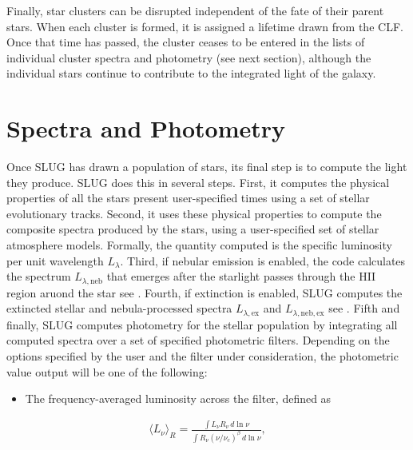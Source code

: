 \documentclass[letterpaper,10pt,english]{sphinxmanual}
\begin{document}
Finally, star clusters can be disrupted independent of the fate of their parent stars. When each cluster is formed, it is assigned a lifetime drawn from the CLF. Once that time has passed, the cluster ceases to be entered in the lists of individual cluster spectra and photometry (see next section), although the individual stars continue to contribute to the integrated light of the galaxy.


\section{Spectra and Photometry}
\label{\detokenize{intro:spectra-and-photometry}}\label{\detokenize{intro:ssec-spec-phot}}
Once SLUG has drawn a population of stars, its final step is to compute the light they produce. SLUG does this in several steps. First, it computes the physical properties of all the stars present user-specified times using a set of stellar evolutionary tracks. Second, it uses these physical properties to compute the composite spectra produced by the stars, using a user-specified set of stellar atmosphere models. Formally, the quantity computed is the specific luminosity per unit wavelength \(L_\lambda\). Third, if nebular emission is enabled, the code calculates the spectrum \(L_{\lambda,\mathrm{neb}}\) that emerges after the starlight passes through the HII region aruond the star \textendash{} see {\hyperref[\detokenize{intro:ssec-nebula}]{}}. Fourth, if extinction is enabled, SLUG computes the extincted stellar and nebula-processed spectra \(L_{\lambda,\mathrm{ex}}\) and \(L_{\lambda,\mathrm{neb,ex}}\) \textendash{} see {\hyperref[\detokenize{intro:ssec-extinction}]{}}. Fifth and finally, SLUG computes photometry for the stellar population by integrating all computed spectra over a set of specified photometric filters. Depending on the options specified by the user and the filter under consideration, the photometric value output will be one of the following:
\begin{itemize}
\item {} 
The frequency-averaged luminosity across the filter, defined as

\end{itemize}
\begin{equation*}
\begin{split}\langle L_\nu\rangle_R = \frac{\int L_\nu R_\nu \, d\ln\nu}{\int R_\nu (\nu/\nu_c)^\beta \, d\ln\nu},\end{split}
\end{equation*}
\end{document}
